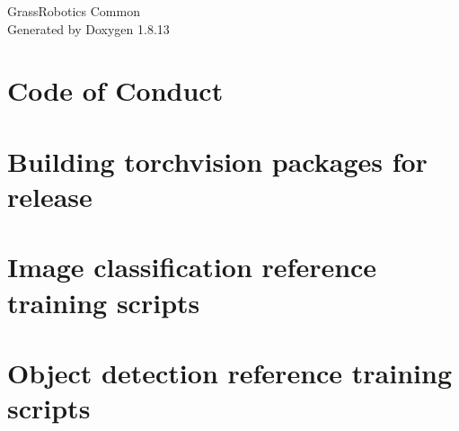 \documentclass[twoside]{book}
\newcommand{\+}{\discretionary{\mbox{\scriptsize$\hookleftarrow$}}{}{}}
\newcommand{\clearemptydoublepage}{%
  \newpage{\pagestyle{empty}\cleardoublepage}%
}
\begin{document}
\hypersetup{pageanchor=false,
             bookmarksnumbered=true,
             pdfencoding=unicode
            }
\begin{titlepage}
\vspace*{7cm}
\begin{center}%
{\Large Grass\+Robotics Common }\\
\vspace*{1cm}
{\large Generated by Doxygen 1.8.13}\\
\end{center}
\end{titlepage}
\clearemptydoublepage
{}
\tableofcontents
\clearemptydoublepage
{}
\hypersetup{pageanchor=true}

\chapter{Code of Conduct}
\label{md__home_jose_ros_ws_src_gr_perception_gr_ml_nb_vision_CODE_OF_CONDUCT}

\chapter{Building torchvision packages for release}
\label{md__home_jose_ros_ws_src_gr_perception_gr_ml_nb_vision_packaging_README}

\chapter{Image classification reference training scripts}
\label{md__home_jose_ros_ws_src_gr_perception_gr_ml_nb_vision_references_classification_README}

\chapter{Object detection reference training scripts}
\label{md__home_jose_ros_ws_src_gr_perception_gr_ml_nb_vision_references_detection_README}

\end{document}
